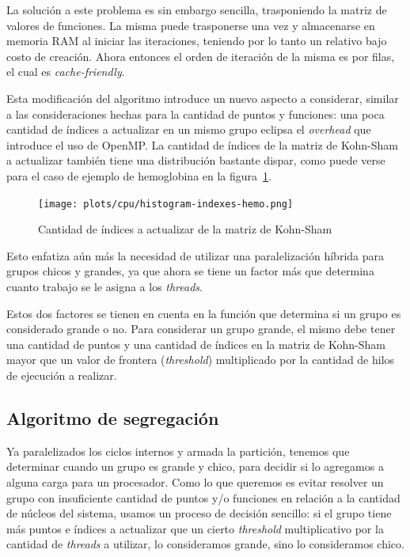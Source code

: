 La soluci\'on a este problema es sin embargo sencilla, trasponiendo la matriz de
valores de funciones. La misma puede trasponerse una vez y almacenarse en memoria
RAM al iniciar las iteraciones, teniendo por lo tanto un relativo bajo costo de
creaci\'on. Ahora entonces el orden de iteraci\'on de la misma es por filas, el
cual es \textit{cache-friendly}.

Esta modificaci\'on del algoritmo introduce un nuevo aspecto a considerar, similar
a las consideraciones hechas para la cantidad de puntos y funciones: una poca
cantidad de \'indices a actualizar en un mismo grupo eclipsa el \textit{overhead}
que introduce el uso de OpenMP. La cantidad de \'indices de la matriz de Kohn-Sham a
actualizar tambi\'en tiene una distribuci\'on bastante dispar, como puede verse
para el caso de ejemplo de hemoglobina en la figura~\ref{fig:histogram-indexes-hemo}.

\begin{figure}[htbp]
   \centering
   \texttt{[image: plots/cpu/histogram-indexes-hemo.png]}
   \caption{Cantidad de \'indices a actualizar de la matriz de Kohn-Sham}
   \label{fig:histogram-indexes-hemo}
\end{figure}

Esto enfatiza a\'un m\'as la necesidad de utilizar una paralelizaci\'on h\'ibrida
para grupos chicos y grandes, ya que ahora se tiene un factor m\'as que determina
cuanto trabajo se le asigna a los \textit{threads}.

Estos dos factores se tienen en cuenta en la funci\'on que determina si un grupo
es considerado grande o no. Para considerar un grupo grande, el mismo debe tener
una cantidad de puntos y una cantidad de \'indices en la matriz de Kohn-Sham mayor que
un valor de frontera (\textit{threshold}) multiplicado por la cantidad de hilos de
ejecuci\'on a realizar.

\subsection{Algoritmo de segregaci\'on}

Ya paralelizados los ciclos internos y armada la partici\'on,  tenemos que determinar
cuando un grupo es grande y chico, para
decidir si lo agregamos a alguna carga para un procesador. Como lo que
queremos es evitar resolver un grupo con insuficiente cantidad de puntos y/o
funciones en relaci\'on a la cantidad de n\'ucleos del sistema, usamos un
proceso de decisi\'on sencillo: si el grupo tiene m\'as puntos e \'indices a
actualizar que un cierto \textit{threshold} multiplicativo por la cantidad de
\textit{threads} a utilizar, lo consideramos grande, sino lo consideramos chico.

